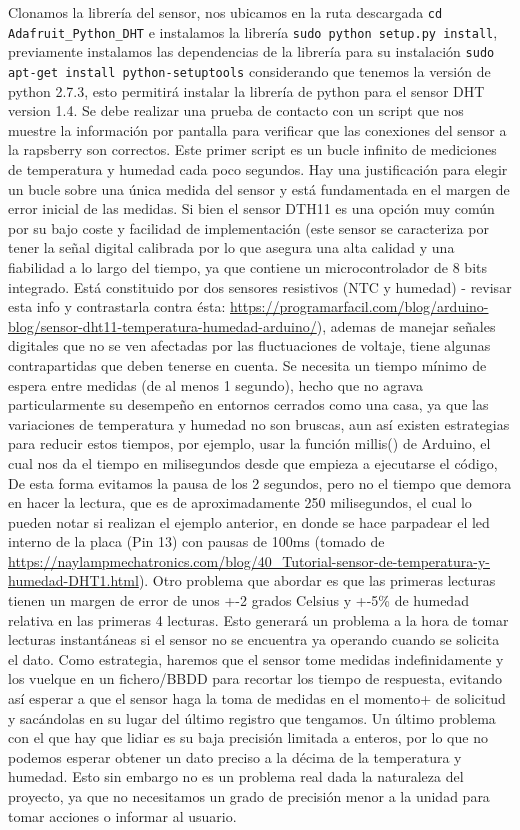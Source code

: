 Clonamos la librería del sensor, nos ubicamos en la ruta descargada \verb|cd Adafruit_Python_DHT| e instalamos la librería \verb|sudo python setup.py install|, previamente instalamos las dependencias de la librería para su instalación \verb|sudo apt-get install python-setuptools| considerando que tenemos la versión de python 2.7.3, esto permitirá instalar la librería de python para el sensor DHT version 1.4. Se debe realizar una prueba de contacto con un script que nos muestre la información por pantalla para verificar que las conexiones del sensor a la rapsberry son correctos. Este primer script es un bucle infinito de mediciones de temperatura y humedad cada poco segundos. Hay una justificación para elegir un bucle sobre una única medida del sensor y está fundamentada en el margen de error inicial de las medidas. Si bien el sensor DTH11 es una opción muy común por su bajo coste y facilidad de implementación (este sensor se caracteriza por tener la señal digital calibrada por lo que asegura una alta calidad y una fiabilidad a lo largo del tiempo, ya que contiene un microcontrolador de 8 bits integrado. Está constituido por dos sensores resistivos (NTC y humedad) - revisar esta info y contrastarla contra ésta: \url{ https://programarfacil.com/blog/arduino-blog/sensor-dht11-temperatura-humedad-arduino/}), ademas de manejar señales digitales que no se ven afectadas por las fluctuaciones de voltaje, tiene algunas contrapartidas que deben tenerse en cuenta. Se necesita un tiempo mínimo de espera entre medidas (de al menos 1 segundo), hecho que no agrava particularmente su desempeño en entornos cerrados como una casa, ya que las variaciones de temperatura y humedad no son bruscas, aun así existen estrategias para reducir estos tiempos, por ejemplo, usar la función millis() de Arduino, el cual nos da el tiempo en milisegundos desde que empieza a ejecutarse el código, De esta forma evitamos la pausa de los 2 segundos, pero no el tiempo que demora en hacer la lectura, que es de aproximadamente  250 milisegundos, el cual lo pueden notar si realizan el ejemplo anterior, en donde se hace parpadear el led interno de la placa (Pin 13) con pausas de 100ms (tomado de \url{https://naylampmechatronics.com/blog/40_Tutorial-sensor-de-temperatura-y-humedad-DHT1.html}). Otro problema que abordar es que las primeras lecturas tienen un margen de error de unos +-2 grados Celsius y +-5\% de humedad relativa en las primeras 4 lecturas. Esto generará un problema a la hora de tomar lecturas instantáneas si el sensor no se encuentra ya operando cuando se solicita el dato. Como estrategia, haremos que el sensor tome medidas indefinidamente y los vuelque en un fichero/BBDD para recortar los tiempo de respuesta, evitando así esperar a que el sensor haga la toma de medidas en el momento+ de solicitud y sacándolas en su lugar del último registro que tengamos. Un último problema con el que hay que lidiar es su baja precisión limitada a enteros, por lo que no podemos esperar obtener un dato preciso a la décima de la temperatura y humedad. Esto sin embargo no es un problema real dada la naturaleza del proyecto, ya que no necesitamos un grado de precisión menor a la unidad para tomar acciones o informar al usuario.

